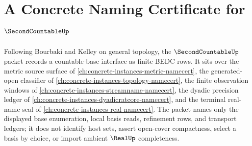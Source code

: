 \chapter{A Concrete Naming Certificate for $\SecondCountableUp$}
\label{ch:concrete-instances-second-countable-namecert}

Following Bourbaki and Kelley on general topology, the $\SecondCountableUp$ packet records a countable-base interface as finite BEDC rows. It sits over the metric source surface of \autoref{ch:concrete-instances-metric-namecert}, the generated-open classifier of \autoref{ch:concrete-instances-topology-namecert}, the finite observation windows of \autoref{ch:concrete-instances-streamname-namecert}, the dyadic precision ledger of \autoref{ch:concrete-instances-dyadicratcore-namecert}, and the terminal real-name seal of \autoref{ch:concrete-instances-real-namecert}. The packet names only the displayed base enumeration, local basis reads, refinement rows, and transport ledgers; it does not identify host sets, assert open-cover compactness, select a basis by choice, or import ambient $\RealUp$ completeness.

